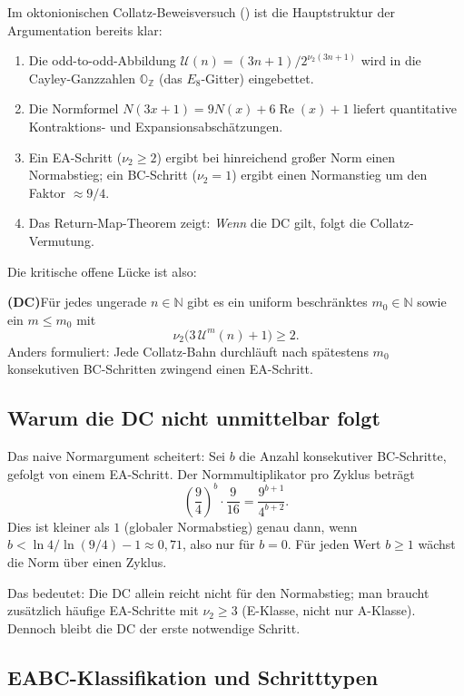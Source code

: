 \documentclass[12pt,a4paper]{article}
\newcommand{\vii}{\nu_2}
\newcommand{\U}{\mathcal{U}}
\newcommand{\N}{\mathbb{N}}
\newcommand{\Z}{\mathbb{Z}}
\begin{document}
Im oktonionischen Collatz-Beweisversuch (\cite{collatz-oktonionen}) ist
die Hauptstruktur der Argumentation bereits klar:
\begin{enumerate}[label=(\arabic*)]
  \item Die odd-to-odd-Abbildung $\U(n) = (3n+1)/2^{\vii(3n+1)}$
    wird in die Cayley-Ganzzahlen $\mathbb{O}_{\Z}$ (das $E_8$-Gitter) eingebettet.
  \item Die Normformel $N(3x+1) = 9N(x) + 6\operatorname{Re}(x) + 1$ liefert
    quantitative Kontraktions- und Expansionsabschätzungen.
  \item Ein EA-Schritt ($\vii \geq 2$) ergibt bei hinreichend großer Norm
    einen Normabstieg; ein BC-Schritt ($\vii = 1$) ergibt einen Normanstieg
    um den Faktor $\approx 9/4$.
  \item Das Return-Map-Theorem zeigt: \emph{Wenn} die DC gilt,
    folgt die Collatz-Vermutung.
\end{enumerate}

Die kritische offene Lücke ist also:

\begin{tcolorbox}[lücke, title={Durchlaufbedingung (DC) --- Präzise Formulierung}]
\textbf{(DC)}\quad Für jedes ungerade $n \in \N$ gibt es ein uniform beschränktes
$m_0 \in \N$ sowie ein $m \leq m_0$ mit
\[
  \vii\!\bigl(3\,\U^m(n) + 1\bigr) \geq 2.
\]
Anders formuliert: Jede Collatz-Bahn durchläuft nach spätestens $m_0$
konsekutiven BC-Schritten zwingend einen EA-Schritt.
\end{tcolorbox}

\subsection{Warum die DC nicht unmittelbar folgt}

Das naive Normargument scheitert: Sei $b$ die Anzahl konsekutiver BC-Schritte,
gefolgt von einem EA-Schritt. Der Normmultiplikator pro Zyklus beträgt
\[
  \left(\frac{9}{4}\right)^b \cdot \frac{9}{16}
  = \frac{9^{b+1}}{4^{b+2}}.
\]
Dies ist kleiner als $1$ (globaler Normabstieg) genau dann, wenn
$b < \ln 4 / \ln(9/4) - 1 \approx 0{,}71$, also nur für $b = 0$.
Für jeden Wert $b \geq 1$ wächst die Norm über einen Zyklus.

Das bedeutet: Die DC allein reicht nicht für den Normabstieg;
man braucht zusätzlich häufige EA-Schritte mit $\vii \geq 3$
(E-Klasse, nicht nur A-Klasse). Dennoch bleibt die DC der erste notwendige Schritt.

\subsection{EABC-Klassifikation und Schritttypen}
\end{document}
